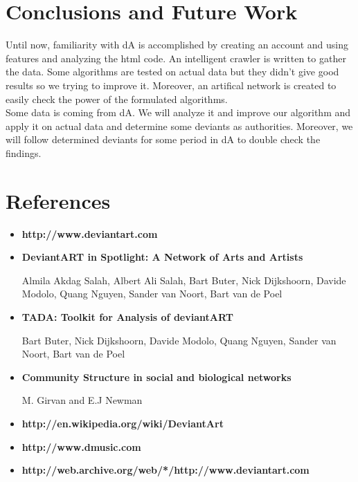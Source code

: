 \documentclass[12pt,a4paper]{report}
\begin{document}
\chapter{Conclusions and Future Work}

	Until now, familiarity with dA is accomplished by creating an account and using features and analyzing the html code. An intelligent crawler is written to gather the data. Some algorithms are tested on actual data but they didn't give good results so we trying to improve it. Moreover, an artifical network is created to easily check the power of the formulated algorithms. \\

	Some data is coming from dA. We will analyze it and improve our algorithm and apply it on actual data and determine some deviants as authorities. Moreover, we will follow determined deviants for some period in dA to double check the findings.


\chapter{References}

\begin{itemize}

\item \textbf{http://www.deviantart.com} \\

\item \textbf{DeviantART in Spotlight: A Network of Arts and Artists }

Almila Akdag Salah, Albert Ali Salah, Bart Buter, Nick Dijkshoorn, Davide Modolo, Quang Nguyen, Sander van Noort, Bart van de Poel \\

\item \textbf{TADA: Toolkit for Analysis of deviantART}

Bart Buter, Nick Dijkshoorn, Davide Modolo, Quang Nguyen, Sander van Noort, Bart van de Poel \\

\item \textbf{Community Structure in social and biological networks}

M. Girvan and E.J Newman \\

\item \textbf{http://en.wikipedia.org/wiki/DeviantArt} \\

\item \textbf{http://www.dmusic.com} \\

\item \textbf{http://web.archive.org/web/*/http://www.deviantart.com} \\

\end{itemize}
\end{document}
